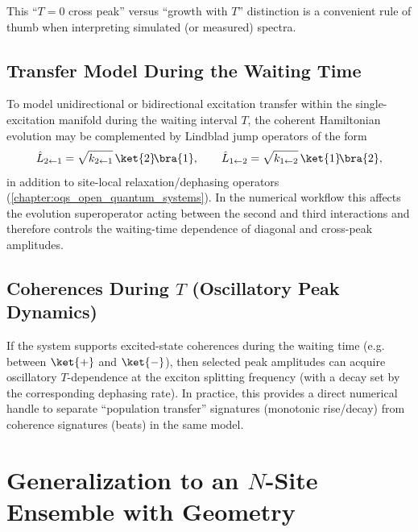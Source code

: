 This ``$T=0$ cross peak'' versus ``growth with $T$'' distinction is a convenient rule of thumb when interpreting simulated (or measured) spectra.

\subsection{Transfer Model During the Waiting Time}
\label{sec:model_dimer_transfer_model}


To model unidirectional or bidirectional excitation transfer within the single-excitation manifold during the waiting interval $T$, the coherent Hamiltonian evolution may be complemented by Lindblad jump operators of the form
\begin{equation*}
	\hat{L}_{2\leftarrow 1} = \sqrt{k_{2\leftarrow 1}}\,\ket{2}\!\bra{1},
	\qquad
	\hat{L}_{1\leftarrow 2} = \sqrt{k_{1\leftarrow 2}}\,\ket{1}\!\bra{2},
\end{equation*}
in addition to site-local relaxation/dephasing operators (\autoref{chapter:oqs_open_quantum_systems}). In the numerical workflow this affects the evolution superoperator acting between the second and third interactions and therefore controls the waiting-time dependence of diagonal and cross-peak amplitudes.

\subsection{Coherences During \texorpdfstring{$T$}{T} (Oscillatory Peak Dynamics)}
\label{sec:model_dimer_coherences}


If the system supports excited-state coherences during the waiting time (e.g. between $\ket{+}$ and $\ket{-}$), then selected peak amplitudes can acquire oscillatory $T$-dependence at the exciton splitting frequency (with a decay set by the corresponding dephasing rate). In practice, this provides a direct numerical handle to separate ``population transfer'' signatures (monotonic rise/decay) from coherence signatures (beats) in the same model.


\section{Generalization to an \texorpdfstring{$N$}{N}-Site Ensemble with Geometry}
\label{sec:model_ensemble}


